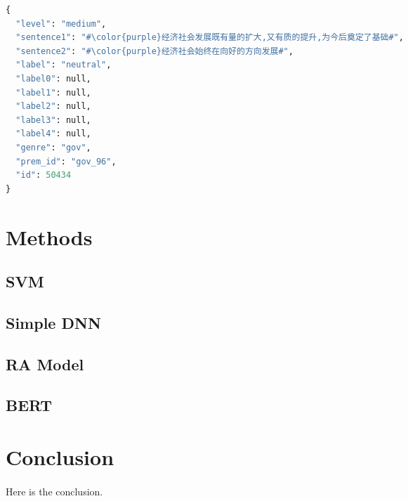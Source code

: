\documentclass{article}
\begin{document}
\begin{CJK*}{UTF8}{bsmi}
\begin{minipage}{\linewidth}
\begin{CJK*}{UTF8}{gbsn}
\begin{lstlisting}[language=Python, escapechar=\#, caption=Example of OCNLI]
{
  "level": "medium",
  "sentence1": "#\color{purple}经济社会发展既有量的扩大,又有质的提升,为今后奠定了基础#",
  "sentence2": "#\color{purple}经济社会始终在向好的方向发展#",
  "label": "neutral",
  "label0": null,
  "label1": null,
  "label2": null,
  "label3": null,
  "label4": null,
  "genre": "gov",
  "prem_id": "gov_96",
  "id": 50434
}
\end{lstlisting}
\end{CJK*}
\end{minipage}

\section{Methods}

\subsection{SVM}

\subsection{Simple DNN}

\subsection{RA Model}

\subsection{BERT}

\section{Conclusion}
\paragraph{}
Here is the conclusion.




\end{CJK*}
\end{document}
